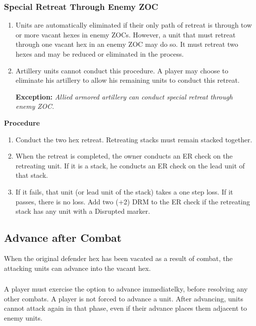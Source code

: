 \subsubsection{\textbf{Special Retreat Through Enemy ZOC}}

\begin{enumerate}[label=\alph*.]
    \item Units are automatically eliminated if their only path of retreat is through tow or more vacant hexes in enemy ZOCs. However, a unit that must retreat through one vacant hex in an enemy ZOC may do so. It must retreat two hexes and may be reduced or eliminated in the process.
    \item Artillery units cannot conduct this procedure. A player may choose to eliminate his artillery to allow his remaining units to conduct this retreat.
    
    \textbf{Exception:} \textit{Allied armored artillery can conduct special retreat through enemy ZOC.}
\end{enumerate}

\textbf{Procedure}

\begin{enumerate}[label=\Roman*.]
    \item Conduct the two hex retreat. Retreating stacks must remain stacked together.
    \item When the retreat is completed, the owner conducts an ER check on the retreating unit. If it is a stack, he conducts an ER check on the lead unit of that stack.
    \item If it fails, that unit (or lead unit of the stack) takes a one step loss. If it passes, there is no loss. Add two (+2) DRM to the ER check if the retreating stack has any unit with a Disrupted marker.
\end{enumerate}

\subsection{Advance after Combat}

When the original defender hex has been vacated as a result of combat, the attacking units can advance into the vacant hex.

\subsubsection{}
A player must exercise the option to advance immediatelky, before resolving any other combats. A player is not forced to advance a unit. After advancing, units cannot attack again in that phase, even if their advance places them adjacent to enemy units.

